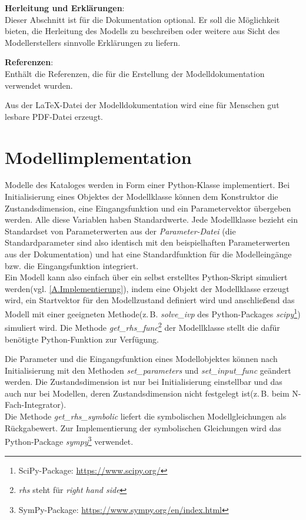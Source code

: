 \textbf{Herleitung und Erklärungen}:\\
Dieser Abschnitt ist für die Dokumentation optional. Er soll die Möglichkeit bieten, die Herleitung des Modells zu beschreiben oder weitere aus Sicht des Modellerstellers sinnvolle Erklärungen zu liefern.

\textbf{Referenzen}:\\
Enthält die Referenzen, die für die Erstellung der Modelldokumentation verwendet wurden.

Aus der \LaTeX-Datei der Modelldokumentation wird eine für Menschen gut lesbare PDF-Datei erzeugt. 

\section{Modellimplementation}
\label{Ch:Ergebnisse:Sec:Implementation}
Modelle des Kataloges werden in Form einer Python-Klasse implementiert. Bei Initialisierung eines Objektes der Modellklasse können dem Konstruktor die Zustandsdimension, eine Eingangsfunktion und ein Parametervektor übergeben werden. Alle diese Variablen haben Standardwerte. Jede Modellklasse bezieht ein Standardset von Parameterwerten aus der \textit{Parameter-Datei} (die Standardparameter sind also identisch mit den beispielhaften Parameterwerten aus der Dokumentation) und hat eine Standardfunktion für die Modelleingänge bzw. die Eingangsfunktion integriert.\\ 
Ein Modell kann also einfach über ein selbst erstelltes Python-Skript simuliert werden(vgl. \ref{A.Implementierung}), indem eine Objekt der Modellklasse erzeugt wird, ein Startvektor für den Modellzustand definiert wird und anschließend das Modell mit einer geeigneten Methode(z.\,B. \textit{solve\_ivp} des Python-Packages \textit{scipy}\footnote{SciPy-Package: \url{https://www.scipy.org/}}) simuliert wird. Die Methode \textit{get\_rhs\_func}\footnote{\textit{rhs} steht für \textit{right hand side}} der Modellklasse stellt die dafür benötigte Python-Funktion zur Verfügung.

Die Parameter und die Eingangsfunktion eines Modellobjektes können nach Initialisierung mit den Methoden \textit{set\_parameters} und \textit{set\_input\_func} geändert werden. Die Zustandsdimension ist nur bei Initialisierung einstellbar und das auch nur bei Modellen, deren Zustandsdimension nicht festgelegt ist(z.\,B. beim N-Fach-Integrator).\\
Die Methode \textit{get\_rhs\_symbolic} liefert die symbolischen Modellgleichungen als Rückgabewert. Zur Implementierung der symbolischen Gleichungen wird das Python-Package \textit{sympy}\footnote{SymPy-Package: \url{https://www.sympy.org/en/index.html}} verwendet.

